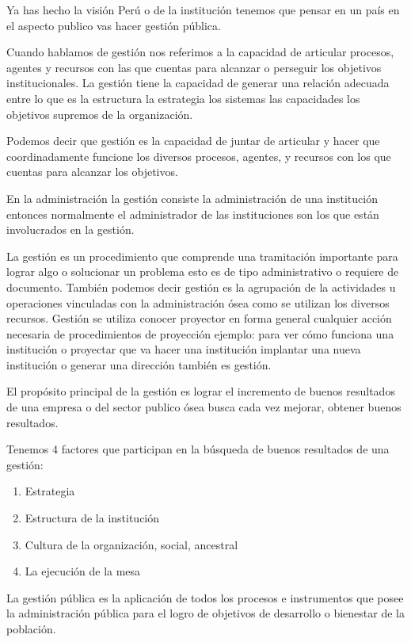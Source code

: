 \documentclass[
  letterpaper,
  DIV=11,
  numbers=noendperiod]{scrartcl}
\providecommand{\tightlist}{%
  \setlength{\itemsep}{0pt}\setlength{\parskip}{0pt}}\usepackage{longtable,booktabs,array}
\begin{document}
Ya has hecho la visión Perú o de la institución tenemos que pensar en un
país en el aspecto publico vas hacer gestión pública.

Cuando hablamos de gestión nos referimos a la capacidad de articular
procesos, agentes y recursos con las que cuentas para alcanzar o
perseguir los objetivos institucionales. La gestión tiene la capacidad
de generar una relación adecuada entre lo que es la estructura la
estrategia los sistemas las capacidades los objetivos supremos de la
organización.

Podemos decir que gestión es la capacidad de juntar de articular y hacer
que coordinadamente funcione los diversos procesos, agentes, y recursos
con los que cuentas para alcanzar los objetivos.

En la administración la gestión consiste la administración de una
institución entonces normalmente el administrador de las instituciones
son los que están involucrados en la gestión.

La gestión es un procedimiento que comprende una tramitación importante
para lograr algo o solucionar un problema esto es de tipo administrativo
o requiere de documento. También podemos decir gestión es la agrupación
de la actividades u operaciones vinculadas con la administración ósea
como se utilizan los diversos recursos. Gestión se utiliza conocer
proyector en forma general cualquier acción necesaria de procedimientos
de proyección ejemplo: para ver cómo funciona una institución o
proyectar que va hacer una institución implantar una nueva institución o
generar una dirección también es gestión.

El propósito principal de la gestión es lograr el incremento de buenos
resultados de una empresa o del sector publico ósea busca cada vez
mejorar, obtener buenos resultados.

Tenemos 4 factores que participan en la búsqueda de buenos resultados de
una gestión:

\begin{enumerate}
\def\labelenumi{\arabic{enumi}.}
\tightlist
\item
  Estrategia
\item
  Estructura de la institución
\item
  Cultura de la organización, social, ancestral
\item
  La ejecución de la mesa
\end{enumerate}

La gestión pública es la aplicación de todos los procesos e instrumentos
que posee la administración pública para el logro de objetivos de
desarrollo o bienestar de la población.
\end{document}
